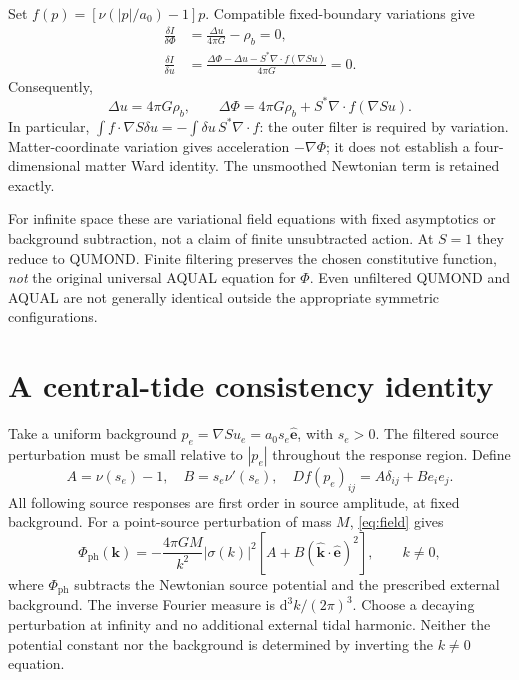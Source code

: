 \documentclass[11pt,letterpaper]{article}
\newcommand{\ph}{\mathrm{ph}}\newcommand{\dd}{\mathrm{d}}
\newcommand{\ee}{\hat{\boldsymbol e}}\newcommand{\kk}{\hat{\boldsymbol k}}
\begin{document}
Set $f(p)=[\nu(|p|/a_0)-1]p$. Compatible fixed-boundary variations give
\begin{align}
 \frac{\delta I}{\delta\Phi}&=\frac{\Delta u}{4\pi G}-\rho_b=0,\\
 \frac{\delta I}{\delta u}&=\frac{\Delta\Phi-\Delta u-S^*\nabla\cdot f(\nabla Su)}{4\pi G}=0.
 \label{eq:variation}
\end{align}
Consequently,
\begin{equation}
 \boxed{\Delta u=4\pi G\rho_b,\qquad
 \Delta\Phi=4\pi G\rho_b+S^*\nabla\cdot f(\nabla Su).}
 \label{eq:field}
\end{equation}
In particular, $\int f\cdot\nabla S\delta u=-\int\delta u\,S^*\nabla\cdot f$:
the outer filter is required by variation. Matter-coordinate variation gives
acceleration $-\nabla\Phi$; it does not establish a four-dimensional matter
Ward identity. The unsmoothed Newtonian term is retained exactly.

For infinite space these are variational field equations with fixed
asymptotics or background subtraction, not a claim of finite unsubtracted
action. At $S=1$ they reduce to QUMOND. Finite filtering preserves the chosen
constitutive function, \emph{not} the original universal AQUAL equation for
$\Phi$. Even unfiltered QUMOND and AQUAL are not generally identical outside
the appropriate symmetric configurations.

\newpage
\section{A central-tide consistency identity}
Take a uniform background $p_e=\nabla Su_e=a_0s_e\ee$, with $s_e>0$.
The filtered source perturbation must be small relative to $|p_e|$ throughout
the response region. Define
\begin{equation}
 A=\nu(s_e)-1,\quad B=s_e\nu'(s_e),\quad
 Df(p_e)_{ij}=A\delta_{ij}+B e_i e_j.
 \label{eq:AB}
\end{equation}
All following source responses are first order in source amplitude, at fixed
background. For a point-source perturbation of mass $M$, \eqref{eq:field} gives
\begin{equation}
 \widehat{\Phi}_{\ph}(\boldsymbol k)
 =-\frac{4\pi GM}{k^2}|\sigma(k)|^2
 \left[A+B(\kk\cdot\ee)^2\right],\qquad k\ne0,
 \label{eq:fourier}
\end{equation}
where $\Phi_{\ph}$ subtracts the Newtonian source potential and the prescribed
external background. The inverse Fourier measure is $\dd^3k/(2\pi)^3$.
Choose a decaying perturbation at infinity and no additional external tidal
harmonic. Neither the potential constant nor the background is determined
by inverting the $k\ne0$ equation.
\end{document}
